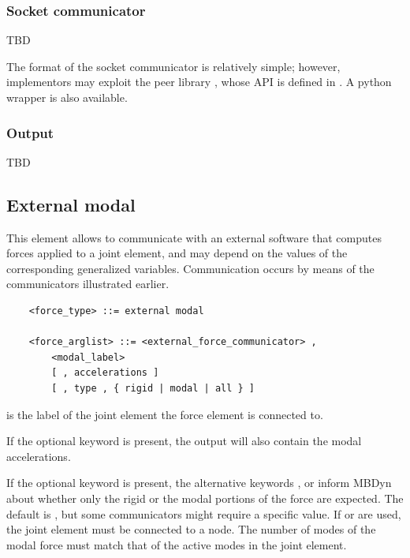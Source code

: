 \subsubsection{Socket communicator}
TBD

The format of the socket communicator is relatively simple;
however, implementors may exploit the peer library ,
whose API is defined in .
A python wrapper is also available.

\subsubsection{Output}
TBD



\subsection{External modal}
\label{sec:EL:FORCE:EXTERNAL:MODAL}
This element allows to communicate with an external software that computes
forces applied to a 
 joint element,
and may depend on the values of the corresponding generalized variables.
Communication occurs by means of the communicators illustrated earlier.
\begin{verbatim}
    <force_type> ::= external modal

    <force_arglist> ::= <external_force_communicator> ,
        <modal_label>
        [ , accelerations ]
        [ , type , { rigid | modal | all } ]
\end{verbatim}
 is the label of the 
 joint element
the force element is connected to.

If the optional keyword  is present,
the output will also contain the modal accelerations.

If the optional keyword  is present,
the alternative keywords ,  or 
inform MBDyn about whether only the rigid or the modal portions
of the force are expected.
The default is , but some communicators might require
a specific value.
If  or  are used, the  joint element
must be connected to a  node.
The number of modes of the modal force must match that of the active modes
in the  joint element.



